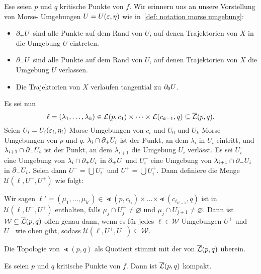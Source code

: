 \begin{definition}
    Ese seien $p$ und $q$ kritische Punkte von $f$. Wir erinnern uns an unsere Vorstellung von Morse-
    Umgebungen $U = U(\varepsilon, \eta)$ wie in~\ref{def: notation morse umgebung}:
    \begin{itemize}
        \item ${ \partial }_+ U$ sind alle Punkte auf dem Rand von $U$, auf denen Trajektorien von $X$ in 
            die Umgebung $U$ eintreten.
        \item ${ \partial }_- U$ sind alle Punkte auf dem Rand von $U$, auf denen Trajektorien von $X$ die
            Umgebung $U$ verlassen.
        \item Die Trajektorien von $X$ verlaufen tangential zu ${ \partial }_0 U$.
    \end{itemize}
    Es sei nun 
    \[ \ell = (\lambda_1, \dots, \lambda_k) 
        \in { \mathcal{L} } (p, c_1) \times \dots \times { \mathcal{L} }(c_{k - 1}, q) \subseteq {\overline{\mathcal{L}} } (p, q) . \]
    Seien $U_i = U_i (\varepsilon_i, \eta_i)$ Morse Umgebungen von $c_i$ und $U_0$ und $U_k$ Morse 
    Umgebungen von $p$ und $q$. $\lambda_i \cap { \partial }_+ U_i$ ist der Punkt, an dem $\lambda_i$
    in $U_i$ eintritt, und $\lambda_{i + 1} \cap { \partial }_- U_i$ ist der Punkt, an dem $\lambda_{i + 1}$
    die Umgebung $U_i$ verlässt. Es sei $U_i^-$ eine Umgebung von $\lambda_i \cap { \partial }_+ U_i$ in 
    ${ \partial }_+ U$ und $U_i^-$ eine Umgebung von $\lambda_{i + 1} \cap { \partial }_- U_i$ in ${ \partial }_- U_i$. 
    Seien dann $U^- = \bigcup U_i^-$ und $U^+ = \bigcup U_i^+$. Dann definiere die Menge 
    $\mathcal{U} (\ell, U^-, U^+)$ wie folgt:

    Wir sagen 
    $\ell' = (\mu_1, ..., \mu_{k'}) \in \Lt (p, c_{i_1}) \times \dots \times \Lt (c_{i_{k'-1}}, q)$
    ist in $\mathcal{U}(\ell, U^-, U^+)$ enthalten, falls $\mu_j \cap U_j^+ \neq \varnothing$
    und $\mu_j \cap U_{j + 1}^- \neq \varnothing$. 
    Dann ist $\mathcal{W} \subseteq {\overline{\mathcal{L}} } (p, q)$ offen genau dann, wenn es für jedes 
    $\ell \in \mathcal{W}$ Umgebungen $U^+$ und $U^-$ wie oben gibt, sodass 
    $\mathcal{U}(\ell, U^+, U^-) \subseteq \mathcal{W}$.
\end{definition}

\begin{remark}
    Die Topologie von $\Lt(p, q)$ als Quotient stimmt mit der von ${\overline{\mathcal{L}} }(p, q)$ überein.
    \todo{}
\end{remark}

\begin{prop}
    \label{prop: Lb ist kompakt}
    Es seien $p$ und $q$ kritische Punkte von $f$. Dann ist ${\overline{\mathcal{L}} } (p, q)$ kompakt.
\end{prop}

